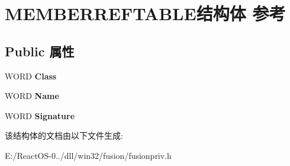 \hypertarget{struct_m_e_m_b_e_r_r_e_f_t_a_b_l_e}{}\section{M\+E\+M\+B\+E\+R\+R\+E\+F\+T\+A\+B\+L\+E结构体 参考}
\label{struct_m_e_m_b_e_r_r_e_f_t_a_b_l_e}
\subsection*{Public 属性}
\begin{DoxyCompactItemize}
\item 
\mbox{\label{struct_m_e_m_b_e_r_r_e_f_t_a_b_l_e_ab446a0236eeef42da069b2754dd67139}} 
W\+O\+RD {\bfseries Class}
\item 
\mbox{\label{struct_m_e_m_b_e_r_r_e_f_t_a_b_l_e_ae773108d903b2fdb14475d931fb1ea32}} 
W\+O\+RD {\bfseries Name}
\item 
\mbox{\label{struct_m_e_m_b_e_r_r_e_f_t_a_b_l_e_a599d3384c247d99441a9b5f1141900c7}} 
W\+O\+RD {\bfseries Signature}
\end{DoxyCompactItemize}


该结构体的文档由以下文件生成\+:\begin{DoxyCompactItemize}
\item 
E\+:/\+React\+O\+S-\/0../dll/win32/fusion/fusionpriv.\+h\end{DoxyCompactItemize}

